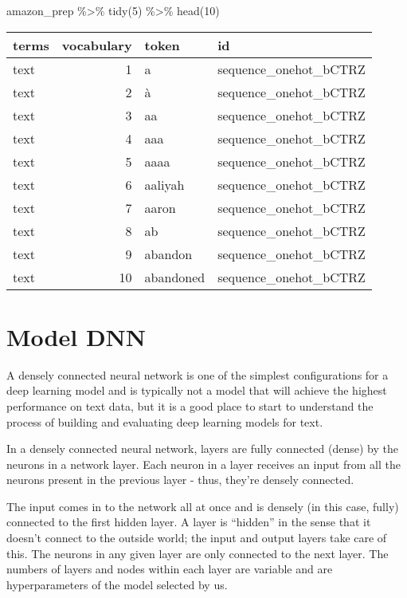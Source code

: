\documentclass[
]{article}
\newenvironment{Shaded}{}{}
\newcommand{\DecValTok}[1]{\textcolor[rgb]{0.25,0.63,0.44}{#1}}
\newcommand{\FunctionTok}[1]{\textcolor[rgb]{0.02,0.16,0.49}{#1}}
\newcommand{\NormalTok}[1]{#1}
\newcommand{\SpecialCharTok}[1]{\textcolor[rgb]{0.25,0.44,0.63}{#1}}
\begin{document}
\begin{Shaded}
\begin{Highlighting}[]
\NormalTok{amazon\_prep }\SpecialCharTok{\%\textgreater{}\%}
    \FunctionTok{tidy}\NormalTok{(}\DecValTok{5}\NormalTok{) }\SpecialCharTok{\%\textgreater{}\%}
    \FunctionTok{head}\NormalTok{(}\DecValTok{10}\NormalTok{)}
\end{Highlighting}
\end{Shaded}

\begin{tabular}{l|r|l|l}
\hline
terms & vocabulary & token & id\\
\hline
text & 1 & a & sequence\_onehot\_bCTRZ\\
\hline
text & 2 & à & sequence\_onehot\_bCTRZ\\
\hline
text & 3 & aa & sequence\_onehot\_bCTRZ\\
\hline
text & 4 & aaa & sequence\_onehot\_bCTRZ\\
\hline
text & 5 & aaaa & sequence\_onehot\_bCTRZ\\
\hline
text & 6 & aaliyah & sequence\_onehot\_bCTRZ\\
\hline
text & 7 & aaron & sequence\_onehot\_bCTRZ\\
\hline
text & 8 & ab & sequence\_onehot\_bCTRZ\\
\hline
text & 9 & abandon & sequence\_onehot\_bCTRZ\\
\hline
text & 10 & abandoned & sequence\_onehot\_bCTRZ\\
\hline
\end{tabular}

\newpage

\hypertarget{model-dnn}{%
\section{Model DNN}\label{model-dnn}}

A densely connected neural network is one of the simplest configurations
for a deep learning model and is typically not a model that will achieve
the highest performance on text data, but it is a good place to start to
understand the process of building and evaluating deep learning models
for text.

In a densely connected neural network, layers are fully connected
(dense) by the neurons in a network layer. Each neuron in a layer
receives an input from all the neurons present in the previous layer -
thus, they're densely connected.

The input comes in to the network all at once and is densely (in this
case, fully) connected to the first hidden layer. A layer is ``hidden''
in the sense that it doesn't connect to the outside world; the input and
output layers take care of this. The neurons in any given layer are only
connected to the next layer. The numbers of layers and nodes within each
layer are variable and are hyperparameters of the model selected by us.
\end{document}
